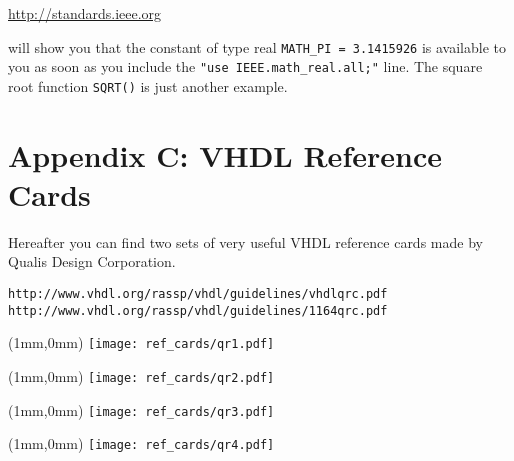 \url{http://standards.ieee.org} 

will show you that the constant of type real \texttt{MATH\_PI = 3.1415926} is available to you as soon as you include the \texttt{"use IEEE.math\_real.all;"} line. The square root function \texttt{SQRT()} is just another example.

\chapter{Appendix C: VHDL Reference Cards}
Hereafter you can find two sets of very useful VHDL reference cards made by Qualis Design Corporation.

\begin{verbatim}
http://www.vhdl.org/rassp/vhdl/guidelines/vhdlqrc.pdf
http://www.vhdl.org/rassp/vhdl/guidelines/1164qrc.pdf
\end{verbatim}

\newpage\clearpage
\thispagestyle{empty}
\begin{textblock*}{174mm}(1mm,0mm)
\texttt{[image: ref\_cards/qr1.pdf]}
\end{textblock*}
\null\newpage

\thispagestyle{empty}
\begin{textblock*}{174mm}(1mm,0mm)
\texttt{[image: ref\_cards/qr2.pdf]}
\end{textblock*}
\null\newpage

\thispagestyle{empty}
\begin{textblock*}{174mm}(1mm,0mm)
\texttt{[image: ref\_cards/qr3.pdf]}
\end{textblock*}
\null\newpage

\thispagestyle{empty}
\begin{textblock*}{174mm}(1mm,0mm)
\texttt{[image: ref\_cards/qr4.pdf]}
\end{textblock*}
\null\newpage

